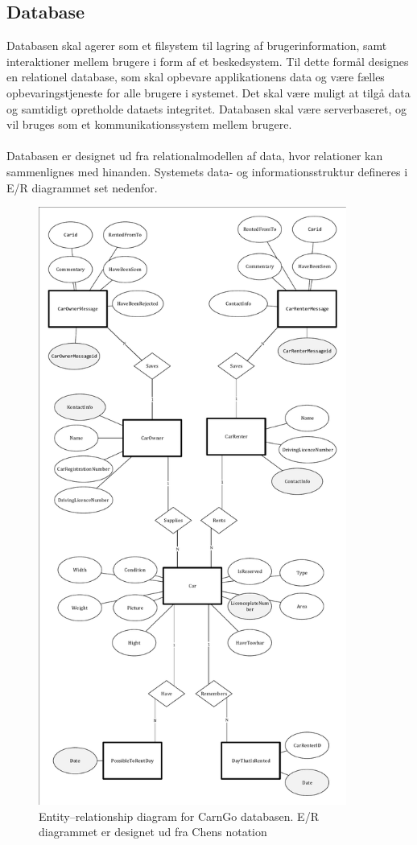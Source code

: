 \documentclass[Rapport/Rapport_main.tex]{subfiles}
\begin{document}
\subsection{Database}
Databasen skal agerer som et filsystem til lagring af brugerinformation, samt interaktioner mellem brugere i form af et beskedsystem. Til dette formål designes en relationel database, som skal opbevare applikationens data og være fælles opbevaringstjeneste for alle brugere i systemet. Det skal være muligt at tilgå data og samtidigt opretholde dataets integritet. Databasen skal være serverbaseret, og vil bruges som et kommunikationssystem mellem brugere. \\\\
Databasen er designet ud fra relationalmodellen af data, hvor relationer kan sammenlignes med hinanden. Systemets data- og informationsstruktur defineres i E/R diagrammet set nedenfor. 
\begin{figure}[H]
    \centering
    \includegraphics[width=0.9\textwidth]{Arkitektur/Softwarearkitektur/Database/graphics/ER.pdf}
    \caption{Entity–relationship diagram for CarnGo databasen. E/R diagrammet er designet ud fra Chens notation}
    \label{fig:ERDiagram}
\end{figure}
\end{document}
